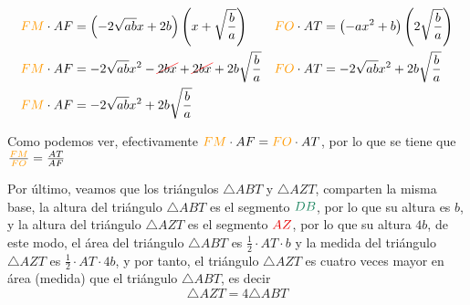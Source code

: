 \documentclass{amsart}
\begin{document}
{    \begin{align*}
        \fm \cdot AF &= \left(-2\sqrt{ab}x+2b\right)\left( x + \sqrt{\frac{b}{a}} \right) &
        \fo \cdot AT &= \left(-ax^2 + b\right)\left( 2 \sqrt{\frac{b}{a}} \right) \\
        \fm \cdot AF &= -2\sqrt{ab}x^2 - \cancelc[red]{2bx} + \cancelc[red]{2bx} + 2b \sqrt{\frac{b}{a}} &
        \fo \cdot AT &= -2\sqrt{ab}x^2 + 2b\sqrt{\frac{b}{a}} \\
        \fm \cdot AF &= -2\sqrt{ab}x^2 + 2b \sqrt{\frac{b}{a}} & \\
    \end{align*}

    Como podemos ver, efectivamente $\fm \cdot AF = \fo \cdot AT$, por lo que se tiene que $\frac{\fm}{\fo} = \frac{AT}{AF}$

    Por último, veamos que los triángulos $\triangle ABT$ y $\triangle AZT$, comparten la misma base, la altura del triángulo $\triangle ABT$ es el segmento $\db$, por lo que su altura es $b$, y la altura del triángulo $\triangle AZT$ es el segmento $\az$, por lo que su altura $4b$, de este modo, el área del triángulo $\triangle ABT$ es $\frac{1}{2} \cdot AT \cdot b$ y la medida del triángulo $\triangle AZT$ es $\frac{1}{2} \cdot  AT \cdot 4b $, y por tanto, el triángulo $\triangle AZT$ es cuatro veces mayor en área (medida) que el triángulo $\triangle ABT$, es decir
    $$ \triangle AZT = 4 \triangle ABT $$
}
\end{document}
